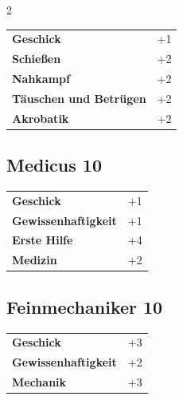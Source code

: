 \begin{multicols}{2}
\begin{tcolorbox}
\begin{tabular}{@{}ll@{}}
    \textbf{Geschick} & +1\\
    \textbf{Schießen} & +2\\
    \textbf{Nahkampf} & +2\\
    \textbf{Täuschen und Betrügen} & +2\\
    \textbf{Akrobatik} & +2\\
\end{tabular}


\end{tcolorbox}

\begin{tcolorbox}
    \subsection*{Medicus \hfill \small{10 }}
    \tcblower




\begin{tabular}{@{}ll@{}}
    \textbf{Geschick} & +1\\
    \textbf{Gewissenhaftigkeit} & +1\\
    \textbf{Erste Hilfe} & +4\\
    \textbf{Medizin} & +2\\
\end{tabular}


\end{tcolorbox}

\begin{tcolorbox}
    \subsection*{Feinmechaniker \hfill \small{10 }}
    \tcblower




\begin{tabular}{@{}ll@{}}
    \textbf{Geschick} & +3\\
    \textbf{Gewissenhaftigkeit} & +2\\
    \textbf{Mechanik} & +3\\
\end{tabular}


\end{tcolorbox}
\end{multicols}
